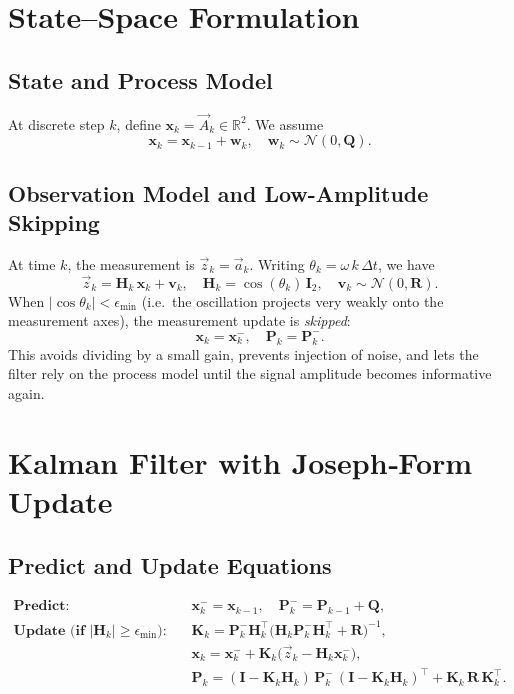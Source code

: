 \documentclass[11pt,letterpaper]{article}
\begin{document}
\section{State–Space Formulation}
\subsection{State and Process Model}
At discrete step \(k\), define
\(\bm{x}_k=\vec{A}_k\in\mathbb{R}^2\).  We assume
\[
\bm{x}_k = \bm{x}_{k-1} + \bm{w}_k,\quad
\bm{w}_k\sim\mathcal{N}(0,\bm{Q}).
\]

\subsection{Observation Model and Low-Amplitude Skipping}
At time \(k\), the measurement is \(\vec{z}_k=\vec{a}_k\).  Writing \(\theta_k = \omega\,k\,\Delta t\), we have
\[
\vec{z}_k
= \bm{H}_k\,\bm{x}_k + \bm{v}_k,
\quad
\bm{H}_k = \cos(\theta_k)\,\bm{I}_2,
\quad
\bm{v}_k\sim\mathcal{N}(0,\bm{R}).
\]
When \(\lvert\cos\theta_k\rvert<\epsilon_{\min}\) (i.e.\ the oscillation projects very weakly onto the measurement axes), the measurement update is \emph{skipped}:
\[
\bm{x}_k = \bm{x}_k^-,\quad \bm{P}_k = \bm{P}_k^-.
\]
This avoids dividing by a small gain, prevents injection of noise, and lets the filter rely on the process model until the signal amplitude becomes informative again.

\section{Kalman Filter with Joseph‐Form Update}

\subsection{Predict and Update Equations}
\begin{align*}
\textbf{Predict:}\quad
&\bm{x}_k^- = \bm{x}_{k-1},\quad
\bm{P}_k^- = \bm{P}_{k-1} + \bm{Q},\\
\textbf{Update (if }|\bm{H}_k|\ge\epsilon_{\min}\textbf{):}\quad
&\bm{K}_k = \bm{P}_k^- \bm{H}_k^\top
  \bigl(\bm{H}_k\bm{P}_k^-\bm{H}_k^\top + \bm{R}\bigr)^{-1},\\
&\bm{x}_k = \bm{x}_k^- + \bm{K}_k\bigl(\vec{z}_k - \bm{H}_k\bm{x}_k^-\bigr),\\
&\bm{P}_k
= (\bm{I}-\bm{K}_k\bm{H}_k)\,\bm{P}_k^-\,(\bm{I}-\bm{K}_k\bm{H}_k)^\top
  + \bm{K}_k\,\bm{R}\,\bm{K}_k^\top.
\end{align*}
\end{document}
